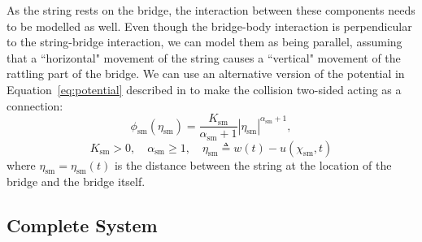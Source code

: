 \documentclass[dvipsnames, pdftex]{article}
\def\stringx{\chi}
\def\us{u}
\def\um{w}
\begin{document}
As the string rests on the bridge, the interaction between these components needs to be modelled as well. Even though the bridge-body interaction is perpendicular to the string-bridge interaction, we can model them as being parallel, assuming that a ``horizontal" movement of the string causes a ``vertical" movement of the rattling part of the bridge. We can use an alternative version of the potential in Equation~\eqref{eq:potential} described in \cite{Bilbao2019} to make the collision two-sided acting as a connection:
\begin{equation}\label{eq:phiConnection}
    \phi_\text{sm}(\eta_\text{sm}) = \frac{K_\text{sm}}{\alpha_\text{sm}+1}|\eta_\text{sm}|^{\alpha_\text{sm}+1},
\end{equation}
%
\begin{equation*}
    K_\text{sm}>0, \quad \alpha_\text{sm}\geq 1, \quad \eta_\text{sm}\triangleq \um(t) - \us(\stringx_\text{sm},t)
\end{equation*}
where $\eta_\text{sm} = \eta_\text{sm}(t)$ is the distance between the string at the location of the bridge and the bridge itself. 

\subsection{Complete System}
\end{document}
